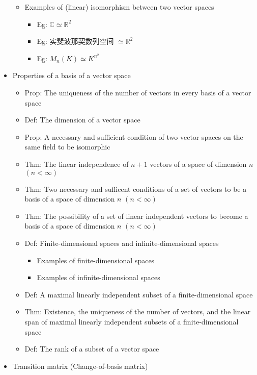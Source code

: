 \documentclass[onecolumn]{ctexart}
\begin{document}
\begin{itemize}
\begin{itemize}
\begin{itemize}
    \end{itemize}
    \item Examples of (linear) isomorphism between two vector spaces
    \begin{itemize}
      \item Eg: $\mathbb{C} \simeq \mathbb{R}^2$
      \item Eg: 实斐波那契数列空间 $\simeq \mathbb{R}^2$
      \item Eg: $M_n(K) \simeq K^{n^2}$
    \end{itemize}
  \end{itemize}
  \item Properties of a basis of a vector space
  \begin{itemize}
    \item Prop: The uniqueness of the number of vectors in every basis of a vector space
    \item Def: The dimension of a vector space
    \item Prop: A necessary and sufficient condition of two vector spaces on the same field to be isomorphic
    \item Thm: The linear independence of $n+1$ vectors of a space of dimension $n$ $(n < \infty)$
    \item Thm: Two necessary and sufficent conditions of a set of vectors to be a basis of a space of dimension $n$ $(n < \infty)$
    \item Thm: The possibility of a set of linear independent vectors to become a basis of a space of dimension $n$ $(n < \infty)$
    \item Def: Finite-dimensional spaces and infinite-dimensional spaces
    \begin{itemize}
      \item Examples of finite-dimensional spaces
      \item Examples of infinite-dimensional spaces
    \end{itemize}
    \item Def: A maximal linearly independent subset of a finite-dimensional space
    \item Thm: Existence, the uniqueness of the number of vectors, and the linear span of maximal linearly independent subsets of a finite-dimensional space
    \item Def: The rank of a subset of a vector space 
  \end{itemize}
  \item Transition matrix (Change-of-basis matrix)
  \begin{itemize}

\end{itemize}
\end{itemize}
\end{document}
